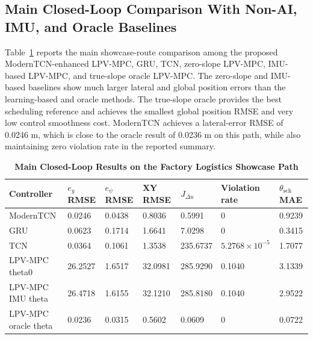 \documentclass{ieeeaccess}
\begin{document}
\label{sec:results}

\subsection{Main Closed-Loop Comparison With Non-AI, IMU, and Oracle Baselines}

Table~\ref{tab:main_closed_loop} reports the main showcase-route comparison among the proposed ModernTCN-enhanced LPV-MPC, GRU, TCN, zero-slope LPV-MPC, IMU-based LPV-MPC, and true-slope oracle LPV-MPC. The zero-slope and IMU-based baselines show much larger lateral and global position errors than the learning-based and oracle methods. The true-slope oracle provides the best scheduling reference and achieves the smallest global position RMSE and very low control smoothness cost. ModernTCN achieves a lateral-error RMSE of 0.0246 m, which is close to the oracle result of 0.0236 m on this path, while also maintaining zero violation rate in the reported summary.

\begin{table}[!t]

\caption{\textbf{Main Closed-Loop Results on the Factory Logistics Showcase Path}}

\label{tab:main_closed_loop}

\setlength{\tabcolsep}{4pt}

\begin{tabular}{|p{105pt}|p{48pt}|p{48pt}|p{48pt}|p{55pt}|p{48pt}|p{58pt}|}

\hline

Controller & $e_y$ RMSE & $e_{\psi}$ RMSE & XY RMSE & $J_{\Delta u}$ & Violation rate & $\theta_{\mathrm{sch}}$ MAE \\

\hline

ModernTCN & 0.0246 & 0.0438 & 0.8036 & 0.5991 & 0 & 0.9239 \\

GRU & 0.0623 & 0.1714 & 1.6641 & 7.0298 & 0 & 0.3415 \\

TCN & 0.0364 & 0.1061 & 1.3538 & 235.6737 & $5.2768\times10^{-5}$ & 1.7077 \\

LPV-MPC theta0 & 26.2527 & 1.6517 & 32.0981 & 285.9290 & 0.1040 & 3.1339 \\

LPV-MPC IMU theta & 26.4718 & 1.6155 & 32.1210 & 285.8180 & 0.1040 & 2.9522 \\

LPV-MPC oracle theta & 0.0236 & 0.0315 & 0.5602 & 0.0609 & 0 & 0.0722 \\

\hline

\end{tabular}

\end{table}
\end{document}
